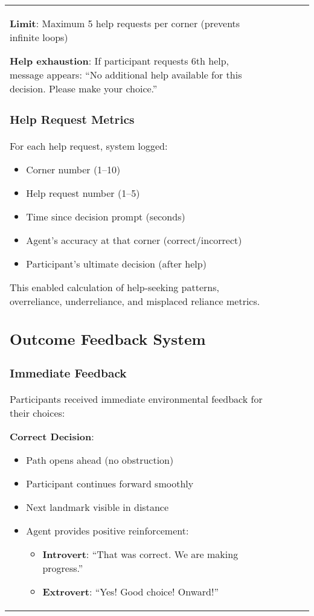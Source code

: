 \documentclass[12pt]{article}
\begin{document}
\begin{longtable}{p{}p{}p{}p{}p{}}
\textbf{Limit}: Maximum 5 help requests per corner (prevents infinite loops)

\textbf{Help exhaustion}: If participant requests 6th help, message appears: ``No additional help available for this decision. Please make your choice.''

\subsubsection{Help Request Metrics}

For each help request, system logged:
\begin{itemize}
    \item Corner number (1--10)
    \item Help request number (1--5)
    \item Time since decision prompt (seconds)
    \item Agent's accuracy at that corner (correct/incorrect)
    \item Participant's ultimate decision (after help)
\end{itemize}

This enabled calculation of help-seeking patterns, overreliance, underreliance, and misplaced reliance metrics.

\subsection{Outcome Feedback System}

\subsubsection{Immediate Feedback}

Participants received immediate environmental feedback for their choices:

\textbf{Correct Decision}:
\begin{itemize}
    \item Path opens ahead (no obstruction)
    \item Participant continues forward smoothly
    \item Next landmark visible in distance
    \item Agent provides positive reinforcement:
    \begin{itemize}
        \item \textbf{Introvert}: ``That was correct. We are making progress.''
        \item \textbf{Extrovert}: ``Yes! Good choice! Onward!''
    \end{itemize}
\end{itemize}


\end{longtable}
\end{document}
